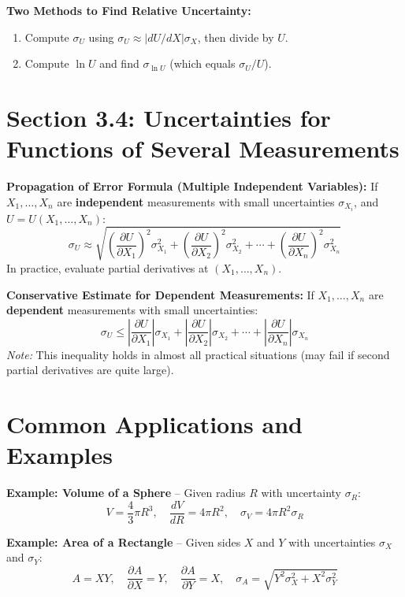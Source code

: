 \documentclass[11pt]{article}
\begin{document}
\textbf{Two Methods to Find Relative Uncertainty:}
\begin{enumerate}[nosep]
    \item Compute \(\sigma_U\) using \(\sigma_U \approx |dU/dX|\sigma_X\), then divide by \(U\).
    \item Compute \(\ln U\) and find \(\sigma_{\ln U}\) (which equals \(\sigma_U/U\)).
\end{enumerate}

\section*{Section 3.4: Uncertainties for Functions of Several Measurements}
\textbf{Propagation of Error Formula (Multiple Independent Variables):}
If \(X_1, \ldots, X_n\) are \textbf{independent} measurements with small uncertainties \(\sigma_{X_i}\), and \(U = U(X_1, \ldots, X_n)\):
\[
\sigma_U \approx \sqrt{\left(\frac{\partial U}{\partial X_1}\right)^2\sigma_{X_1}^2 + \left(\frac{\partial U}{\partial X_2}\right)^2\sigma_{X_2}^2 + \cdots + \left(\frac{\partial U}{\partial X_n}\right)^2\sigma_{X_n}^2}
\]
In practice, evaluate partial derivatives at \((X_1, \ldots, X_n)\).

\textbf{Conservative Estimate for Dependent Measurements:}
If \(X_1, \ldots, X_n\) are \textbf{dependent} measurements with small uncertainties:
\[
\sigma_U \leq \left|\frac{\partial U}{\partial X_1}\right|\sigma_{X_1} + \left|\frac{\partial U}{\partial X_2}\right|\sigma_{X_2} + \cdots + \left|\frac{\partial U}{\partial X_n}\right|\sigma_{X_n}
\]
\textit{Note:} This inequality holds in almost all practical situations (may fail if second partial derivatives are quite large).

\section*{Common Applications and Examples}
\textbf{Example: Volume of a Sphere} – Given radius \(R\) with uncertainty \(\sigma_R\):
\[
V = \frac{4}{3}\pi R^3,\quad \frac{dV}{dR} = 4\pi R^2,\quad \sigma_V = 4\pi R^2\sigma_R
\]

\textbf{Example: Area of a Rectangle} – Given sides \(X\) and \(Y\) with uncertainties \(\sigma_X\) and \(\sigma_Y\):
\[
A = XY,\quad \frac{\partial A}{\partial X} = Y,\quad \frac{\partial A}{\partial Y} = X,\quad \sigma_A = \sqrt{Y^2\sigma_X^2 + X^2\sigma_Y^2}
\]
\end{document}

